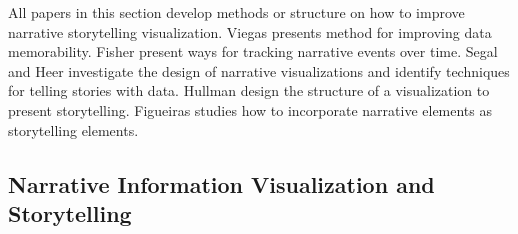 \documentclass{egpubl}
\begin{document}
All papers in this section develop methods or structure on how to improve narrative storytelling visualization. Viegas \cite{viegas2004} presents method for improving data memorability. Fisher \cite{fisher} present ways for tracking narrative events over time. Segal and Heer \cite{segal} investigate the design of narrative visualizations and identify techniques for telling stories with data. Hullman \cite{hullman,hullman2013,hullman2013deeper}
design the structure of a visualization to present storytelling.  Figueiras \cite{figueiras,figueiras2014tell} studies how to incorporate narrative elements as storytelling elements.

\subsection{Narrative Information Visualization and Storytelling}
\end{document}
